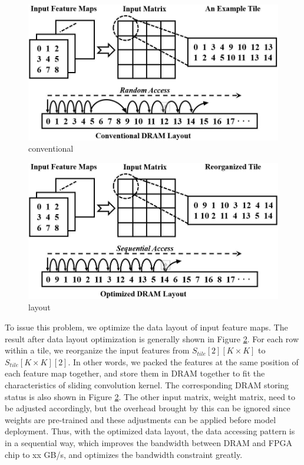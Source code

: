 \documentclass{acm_proc_article-sp-copy}
\begin{document}
\begin{figure}
	\centering
	\includegraphics[width=1.0\linewidth]{./figure/conventional.jpg}
	\caption{conventional}
	\label{conventional}
\end{figure}

\begin{figure}
	\centering
	\includegraphics[width=1.0\linewidth]{./figure/layout.jpg}
	\caption{layout}
	\label{datalayout}
\end{figure}

To issue this problem, we optimize the data layout of input feature maps. The result after data layout optimization is generally shown in Figure \ref{datalayout}. For each row within a tile, we reorganize the input features from $S_{tile}[2][K\times K]$ to $S_{tile}[K\times K][2]$. In other words, we packed the features at the same position of each feature map together, and store them in DRAM together to fit the characteristics of sliding convolution kernel. The corresponding DRAM storing status is also shown in Figure \ref{datalayout}. The other input matrix, weight matrix, need to be adjusted accordingly, but the overhead brought by this can be ignored since weights are pre-trained and these adjustments can be applied before model deployment. Thus, with the optimized data layout, the data accessing pattern is in a sequential way, which improves the bandwidth between DRAM and FPGA chip to xx GB/s, and optimizes the bandwidth constraint greatly.  
\end{document}
